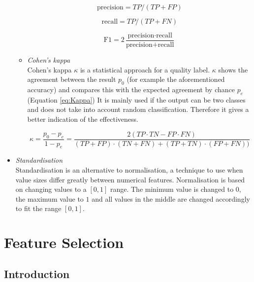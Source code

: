 \documentclass[10pt,a4paper]{report}
\begin{document}
\begin{itemize}
\begin{itemize}
			\begin{equation}\label{eq:Precision}
			\text{precision} = TP / (TP + FP)
			\end{equation}
			
			\begin{equation}\label{eq:Recall}
			\text{recall} = TP / (TP + FN)
			\end{equation}
			
			\begin{equation}\label{eq:F1}
			\text{F1} = 2 \frac{\text{precision} \cdot \text{recall}}{\text{precision} + \text{recall}}
			\end{equation}
			
			\item \textit{Cohen's kappa} \\
			Cohen's kappa $\kappa$ is a statistical approach for a quality label. $\kappa$ shows the agreement between the result $p_0$ (for example the aforementioned accuracy) and compares this with the expected agreement by chance $p_e$ (Equation \ref{eq:Kappa}) It is mainly used if the output can be two classes \cite{blackman2000interval} and does not take into account random classification. Therefore it gives a better indication of the effectiveness.
			
			\begin{equation}\label{eq:Kappa}
			\kappa = \frac{p_0 - p_e}{1 - p_e} = \frac{2(TP \cdot TN - FP \cdot FN)}{(TP + FP) \cdot (TN + FN) + (TP + TN) \cdot (FP + FN))}
			\end{equation} 
		\end{itemize}
		\item \textit{Standardisation} \\
		Standardisation is an alternative to normalisation, a technique to use when value sizes differ greatly between numerical features. Normalisation is based on changing values to a $[0, 1] $ range. The minimum value is changed to $0$, the maximum value to $1$ and all values in the middle are changed accordingly to fit the range $[0, 1]$. 

	\end{itemize}
	
	
	\chapter{Feature Selection}
	\label{chap:FeatureSelection}
	
	\section{Introduction}
	\label{FSsec:Introduction}
	
\end{document}
